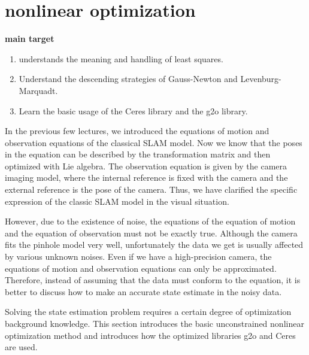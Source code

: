 \chapter{nonlinear optimization}

\label{cpt:6}

\begin{mdframed}  
	\textbf{main target}
	\begin{enumerate}
		\item understands the meaning and handling of least squares.
		\item Understand the descending strategies of Gauss-Newton and Levenburg-\\Marquadt.
		\item Learn the basic usage of the Ceres library and the g2o library.
	\end{enumerate}
\end{mdframed}

In the previous few lectures, we introduced the equations of motion and observation equations of the classical SLAM model. Now we know that the poses in the equation can be described by the transformation matrix and then optimized with Lie algebra. The observation equation is given by the camera imaging model, where the internal reference is fixed with the camera and the external reference is the pose of the camera. Thus, we have clarified the specific expression of the classic SLAM model in the visual situation.

However, due to the existence of noise, the equations of the equation of motion and the equation of observation must not be exactly true. Although the camera fits the pinhole model very well, unfortunately the data we get is usually affected by various unknown noises. Even if we have a high-precision camera, the equations of motion and observation equations can only be approximated. Therefore, instead of assuming that the data must conform to the equation, it is better to discuss how to make an accurate state estimate in the noisy data.

Solving the state estimation problem requires a certain degree of optimization background knowledge. This section introduces the basic unconstrained nonlinear optimization method and introduces how the optimized libraries g2o and Ceres are used.

\newpage

\newpage











